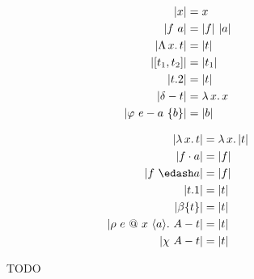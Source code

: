 

\begin{figure}
    \centering
    \begin{minipage}{0.5\textwidth}
        \begin{align*}
            |x| &= x \\
            |f\ a| &= |f|\ |a| \\
            |{\Lambda}\, x.\, t| &= |t| \\
            |[t_1, t_2]| &= |t_1| \\
            |t.2| &= |t| \\
            |\delta - t| &= {\lambda}\, x.\, x \\
            |\varphi\ e - a\ \{ b \}| &= |b|
        \end{align*}
    \end{minipage}%
    \begin{minipage}{0.5\textwidth}
        \begin{align*}
            |\absu{\lambda}{x}{t}| &= \absu{\lambda}{x}{|t|} \\
            |f \cdot a| &= |f| \\
            |f\ \edash a| &= |f| \\
            |t.1| &= |t| \\
            |\beta \{ t \}| &= |t| \\
            |\rho\ e\ @\ x\ \langle a \rangle.\ A - t| &= |t| \\
            |\chi\ A - t| &= |t|
        \end{align*}
    \end{minipage}%
    \caption{
        TODO
    }
    \label{fig:4:erasure}
\end{figure}